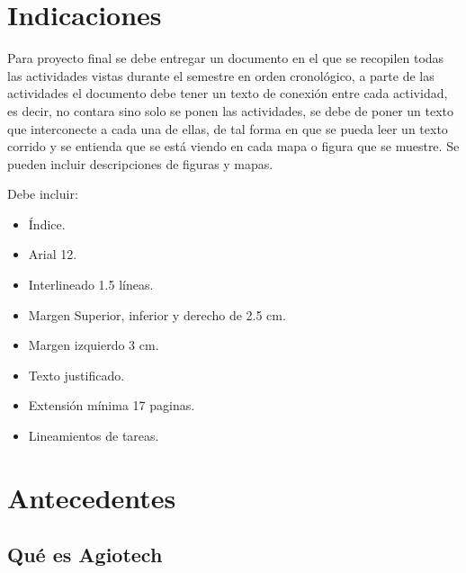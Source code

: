 \clearpage
\listoffigures



\clearpage
\vspace*{-16pt}
\begin{center}
	{\textbf{\huge \theTitle}}
\end{center}
\vspace*{8pt}


\section*{Indicaciones}

Para proyecto final se debe entregar un documento en el que se recopilen
todas las actividades vistas durante el semestre en orden cronológico, a parte
de las actividades el documento debe tener un texto de conexión entre cada
actividad, es decir, no contara sino solo se ponen las actividades, se debe de
poner un texto que interconecte a cada una de ellas, de tal forma en que se
pueda leer un texto corrido y se entienda que se está viendo en cada mapa o
figura que se muestre. Se pueden incluir descripciones de figuras y mapas.

Debe incluir:

\begin{itemize}
	\item Índice.
	\item Arial 12.
	\item Interlineado 1.5 líneas.
	\item Margen Superior, inferior y derecho de 2.5 cm.
	\item Margen izquierdo 3 cm.
	\item Texto justificado.
	\item Extensión mínima 17 paginas.
	\item Lineamientos de tareas.
\end{itemize}


\clearpage
\section{Antecedentes}

\subsection{Qué es Agiotech}

